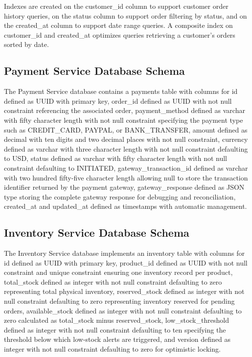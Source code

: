 Indexes are created on the customer\_id column to support customer order history queries, on the status column to support order filtering by status, and on the created\_at column to support date range queries. A composite index on customer\_id and created\_at optimizes queries retrieving a customer's orders sorted by date.

\subsection{Payment Service Database Schema}

The Payment Service database contains a payments table with columns for id defined as UUID with primary key, order\_id defined as UUID with not null constraint referencing the associated order, payment\_method defined as varchar with fifty character length with not null constraint specifying the payment type such as CREDIT\_CARD, PAYPAL, or BANK\_TRANSFER, amount defined as decimal with ten digits and two decimal places with not null constraint, currency defined as varchar with three character length with not null constraint defaulting to USD, status defined as varchar with fifty character length with not null constraint defaulting to INITIATED, gateway\_transaction\_id defined as varchar with two hundred fifty-five character length allowing null to store the transaction identifier returned by the payment gateway, gateway\_response defined as JSON type storing the complete gateway response for debugging and reconciliation, created\_at and updated\_at defined as timestamps with automatic management.

\subsection{Inventory Service Database Schema}

The Inventory Service database implements an inventory table with columns for id defined as UUID with primary key, product\_id defined as UUID with not null constraint and unique constraint ensuring one inventory record per product, total\_stock defined as integer with not null constraint defaulting to zero representing total physical inventory, reserved\_stock defined as integer with not null constraint defaulting to zero representing inventory reserved for pending orders, available\_stock defined as integer with not null constraint defaulting to zero calculated as total\_stock minus reserved\_stock, low\_stock\_threshold defined as integer with not null constraint defaulting to ten specifying the threshold below which low-stock alerts are triggered, and version defined as integer with not null constraint defaulting to zero for optimistic locking.

